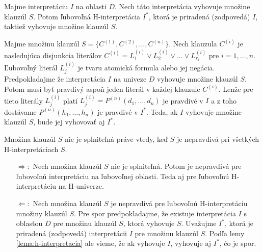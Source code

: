\begin{lema}
    \label{lema:h-interpretacia}
    Majme interpretáciu $I$ na oblasti $D$. Nech táto interpretácia
    vyhovuje množine klauzúl $S$. Potom ľubovoľná H-interpretácia $I^*$,
    ktorá je priradená (zodpovedá) $I$, taktiež vyhovuje množine klauzúl $S$.
\end{lema}

\begin{dokaz}
    Majme množinu klauzúl $S=\{C^{(1)}, C^{(2)}, \ldots , C^{(n)}\}$.
    Nech klauzula $C^{(i)}$ je nasledujúca disjunkcia literálov
    $C^{(i)} = L^{(i)}_1 \lor L^{(i)}_2 \lor \ldots \lor
        L^{(i)}_{r_i}$ pre $i=1,\ldots,n$.
    Ľubovoľný literál $L^{(i)}_j$ je tvaru atomická formula alebo
    jej negácia. Predpokladajme že interpretácia $I$ na univeze $D$
    vyhovuje množine klauzúl $S$. Potom musí byť pravdivý aspoň jeden
    literál v každej klauzule $C^{(i)}$.
    Lenže pre tieto literály
    $L^{(i)}_j$ platí
    $L^{(i)}_j = P^{(n)}(d_1,\dots,d_n)$ je pravdivé v $I$ a z toho
    dostávame $P^{(n)}(h_1, \dots, h_n)$ je pravdivé v $I^*$.
    Teda, ak $I$ vyhovuje množine klauzúl $S$, bude jej vyhovovať aj
    $I^*$.
\end{dokaz}

\begin{veta}
    Množina klauzúl $S$ nie je splniteľná práve vtedy,
    keď $S$ je nepravdivá pri všetkých H-interpretáciach $S$.
\end{veta}


\begin{dokaz}
    \noindent
    \begin{itemize}
    \item[$\Rightarrow:$] Nech množina klauzúl $S$ nie je splniteľná.
        Potom je nepravdivá pre ľubovoľnú interpretáciu na ľubovoľnej
        oblasti.
        Teda aj pre ľubovoľnú H-interpretáciu na H-univerze.

    \item[$\Leftarrow:$] Nech množina klauzúl $S$ je nepravdivá pre
        ľubovoľnú H-interpretáciu množiny klauzúl $S$.
        Pre spor predpokladajme, že existuje interpretácia $I$ 
        s oblasťou $D$ pre množinu klauzúl $S$, ktorá
        vyhovuje $S$.
        Uvažujme $I^*$, ktorá je priradená (zodpovedá) interpretácii
        $I$ pre množinu klauzúl $S$.
        Podľa lemy \ref{lema:h-interpretacia} ale vieme,
        že ak vyhovuje $I$, vyhovuje aj $I^*$, čo je spor.
    \end{itemize}
\end{dokaz}

